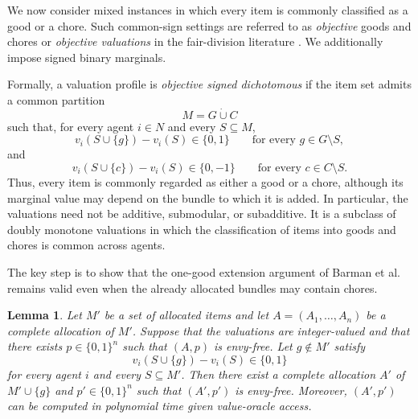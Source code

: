 \documentclass[sigconf,anonymous]{aamas}
\theoremstyle{acmplain}
\newtheorem{lemma}[theorem]{Lemma}
\theoremstyle{acmdefinition}
\theoremstyle{acmplain}
\begin{document}
We now consider mixed instances in which every item is commonly classified as a good or a chore. Such common-sign settings are referred to as \emph{objective} goods and chores or \emph{objective valuations} in the fair-division literature \cite{aziz2022fair,bilo2026approximately}. We additionally impose signed binary marginals.

Formally, a valuation profile is \emph{objective signed dichotomous} if the item set admits a common partition
\[
M=G\mathbin{\dot\cup}C
\]such that, for every agent $i\in N$ and every $S\subseteq M$,
\[
v_i(S\cup\{g\})-v_i(S)\in\{0,1\}
\qquad
\text{for every }g\in G\setminus S,
\]
and
\[
v_i(S\cup\{c\})-v_i(S)\in\{0,-1\}
\qquad
\text{for every }c\in C\setminus S.
\]
Thus, every item is commonly regarded as either a good or a chore, although its marginal value may depend on the bundle to which it is added. In particular, the valuations need not be additive, submodular, or subadditive. It is a subclass of doubly monotone valuations in which the classification of items into goods and chores is common across agents.

The key step is to show that the one-good extension argument of Barman et al.~\cite{BKNS22} remains valid even when the already allocated bundles may contain chores.

\begin{lemma}
\label{lem:goods-extension}
Let $M'$ be a set of allocated items and let $A=(A_1,\ldots,A_n)$ be a complete allocation of $M'$. Suppose that the valuations are integer-valued and that there exists $p\in\{0,1\}^n$ such that $(A,p)$ is envy-free. Let $g\notin M'$
satisfy
\[
v_i(S\cup\{g\})-v_i(S)\in\{0,1\}
\]
for every agent $i$ and every $S\subseteq M'$. Then there exist a complete allocation $A'$ of $M'\cup\{g\}$ and $p'\in\{0,1\}^n$ such that $(A',p')$ is envy-free. Moreover, $(A',p')$ can be computed in polynomial time given value-oracle access.
\end{lemma}
\end{document}
